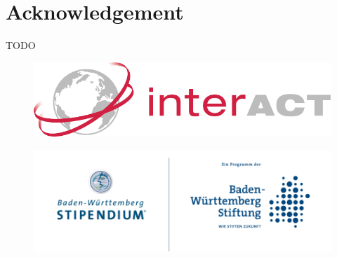\chapter*{Acknowledgement}

TODO

\begin{figure}[h]
    \centering
    \includegraphics*[width=0.5\linewidth, keepaspectratio]{logos/interact-logo.pdf} 
\end{figure}

\begin{figure}[h]
    \centering
    \includegraphics*[width=\linewidth, keepaspectratio]{logos/bw-stipendium.png} 
\end{figure}